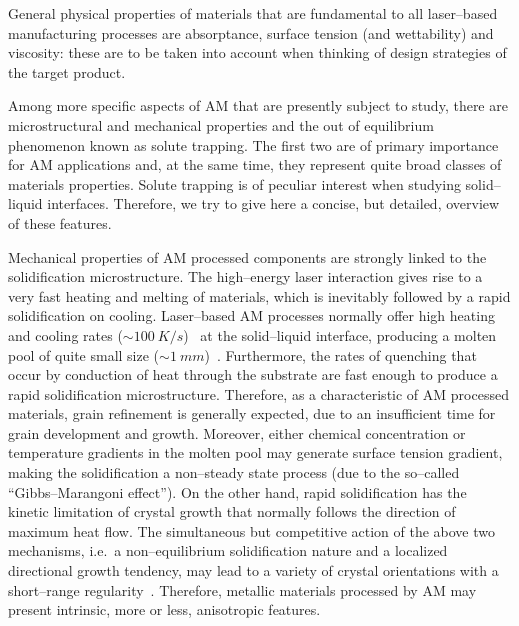 General physical properties of materials that are fundamental to all laser--based manufacturing processes are absorptance, surface tension (and wettability) and viscosity: these are to be taken into account when thinking of design strategies of the target product. 


Among more specific aspects of AM that are presently subject to study, there are microstructural and mechanical properties and the out of equilibrium phenomenon known as solute trapping. The first two are of primary importance for AM applications and, at the same time, they represent quite broad classes of materials properties. Solute trapping is of peculiar interest when studying solid--liquid interfaces. Therefore, we try to give here a concise, but detailed, overview of these features.

Mechanical properties of AM processed components are strongly linked to the solidification microstructure. The high--energy laser interaction gives rise to a very fast heating and melting of materials, which is inevitably followed by a rapid solidification on cooling. Laser--based AM processes normally offer high heating and cooling rates ($\sim\SI{100}{K/s}$)~\cite{Wright2006:GuREVIEW166} at the solid--liquid interface, producing a molten pool of quite small size ($\sim\SI{1}{mm}$)~\cite{Childs2005:GuREVIEW167}. Furthermore, the rates of quenching that occur by conduction of heat through the substrate are fast enough to produce a rapid solidification microstructure. Therefore, as a characteristic of AM processed materials, grain refinement is generally expected, due to an insufficient time for grain development and growth.
Moreover, either chemical concentration or temperature gradients in the molten pool may generate surface tension gradient, making the solidification a non--steady state process (due to the so--called ``Gibbs--Marangoni effect''). On the other hand, rapid solidification has the kinetic limitation of crystal growth that normally follows the direction of maximum heat flow. The simultaneous but competitive action of the above two mechanisms, i.e.\ a non--equilibrium solidification nature and a localized directional growth tendency, may lead to a variety of crystal orientations with a short--range regularity~\cite{Becker2009:GuREVIEW157}. Therefore, metallic materials processed by AM may present intrinsic, more or less, anisotropic features.

